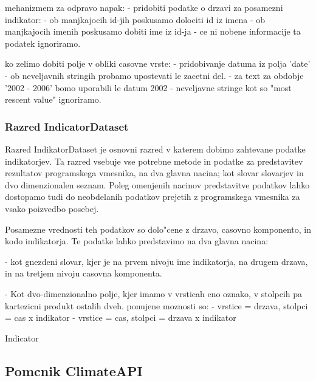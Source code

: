 mehanizmem za odpravo napak:
 - pridobiti podatke o drzavi za posamezni indikator: 
   - ob manjkajocih id-jih poskusamo dolociti id iz imena
   - ob manjkajocih imenih poskusamo dobiti ime iz id-ja
   - ce ni nobene informacije ta podatek ignoriramo.

ko zelimo dobiti polje v obliki casovne vrste:
 - pridobivanje datuma iz polja 'date'
   - ob neveljavnih stringih probamo upostevati le zacetni del.
     - za text za  obdobje  '2002 - 2006' bomo uporabili le datum 2002 
   - neveljavne stringe kot so "most rescent value" ignoriramo.







\subsubsection{Razred IndicatorDataset}

Razred IndikatorDataset je osnovni razred v katerem dobimo zahtevane podatke
indikatorjev. Ta razred vsebuje vse potrebne metode in podatke za predstavitev
rezultatov programskega vmesnika, na dva glavna nacina; kot slovar slovarjev in
dvo dimenzionalen seznam. Poleg omenjenih nacinov predstavitve podatkov lahko
dostopamo tudi do neobdelanih podatkov prejetih z programskega vmesnika za
vsako poizvedbo posebej.


Posamezne vrednosti teh podatkov so dolo"cene z drzavo, casovno komponento, in
kodo indikatorja. Te podatke lahko predstavimo na dva glavna nacina:

 - kot gnezdeni slovar, kjer je na prvem nivoju ime indikatorja, na drugem
   drzava, in na tretjem nivoju casovna komponenta.

 - Kot dvo-dimenzionalno polje, kjer imamo v vrsticah eno oznako, v stolpcih
   pa kartezicni produkt ostalih dveh. ponujene moznosti so:
   - vrstice = drzava, stolpci = cas x indikator
   - vrstice = cas, stolpci = drzava x indikator


Indicator



% 
% 
% 
% 
% 
% 




\subsection{Pomcnik ClimateAPI}

